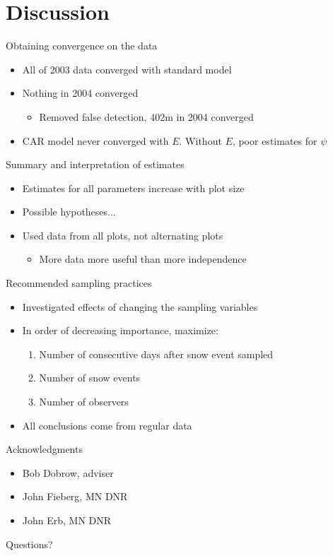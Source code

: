 \documentclass{beamer}
\begin{document}
\section{Discussion}
\begin{frame}{Obtaining convergence on the data}
	\begin{itemize}
		\item All of 2003 data converged with standard model
		\item Nothing in 2004 converged
		\begin{itemize}
			\item Removed false detection, 402m in 2004 converged
		\end{itemize}
		\item CAR model never converged with $E$. Without $E$, poor 
		estimates for $\psi$
	\end{itemize}
\end{frame}
		
\begin{frame}{Summary and interpretation of estimates}
	\begin{itemize}
		\item Estimates for all parameters increase with plot size
		\item Possible hypotheses...
		\item Used data from all plots, not alternating plots
		\begin{itemize}
			\item More data more useful than more independence
		\end{itemize}
	\end{itemize}
\end{frame}

\begin{frame}{Recommended sampling practices}
	\begin{itemize}
		\item Investigated effects of changing the sampling variables
		\item In order of decreasing importance, maximize:
		\begin{enumerate}
			\item Number of consecutive days after snow event sampled
			\item Number of snow events
			\item Number of observers
		\end{enumerate}
		\item All conclusions come from regular data
	\end{itemize}
\end{frame}

\begin{frame}{Acknowledgments}
	\begin{itemize}
		\item Bob Dobrow, adviser
		\item John Fieberg, MN DNR
		\item John Erb, MN DNR
	\end{itemize}
\end{frame}

\begin{frame}{Questions?}
\end{frame}
	
\end{document}
